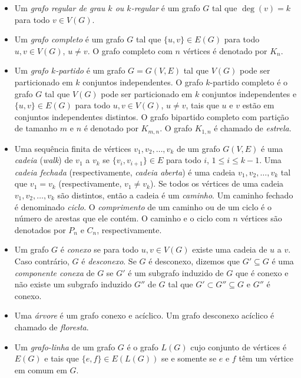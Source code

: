 \documentclass{article}
\begin{document}
\begin{itemize}
    \item Um \emph{grafo regular de grau \(k\) ou \(k\)-regular} é um grafo \(G\) tal que \(\deg(v) = k\) para todo \(v \in V(G)\).
    \item Um \emph{grafo completo} é um grafo \(G\) tal que \(\{u,v\} \in E(G)\) para todo \(u,v \in V(G)\), \(u \neq v\). O grafo completo com \(n\) vértices é denotado por \(K_n\).
    \item Um \emph{grafo \(k\)-partido} é um grafo \(G=G(V,E)\) tal que \(V(G)\) pode ser particionado em \(k\) conjuntos independentes. O grafo \(k\)-partido completo é o grafo \(G\) tal que \(V(G)\) pode ser particionado em \(k\) conjuntos independentes e \(\{u,v\} \in E(G)\) para todo \(u,v \in V(G)\), \(u \neq v\), tais que \(u\) e \(v\) estão em conjuntos independentes distintos. O grafo bipartido completo com partição de tamanho \(m\) e \(n\) é denotado por \(K_{m,n}\). O grafo \(K_{1,n}\) é chamado de \emph{estrela}.
    \item Uma sequência finita de vértices \(v_1, v_2, \ldots, v_k\) de um grafo \(G(V,E)\) é uma \emph{cadeia} (\emph{walk}) de \(v_1\) a \(v_k\) se \(\{v_i, v_{i+1}\} \in E\) para todo \(i\), \(1 \leq i \leq k-1\). Uma \emph{cadeia fechada} (respectivamente, \emph{cadeia aberta}) é uma cadeia \(v_1, v_2, \ldots, v_k\) tal que \(v_1 = v_k\) (respectivamente, \(v_1 \neq v_k\)). Se todos os vértices de uma cadeia \(v_1, v_2, \ldots, v_k\) são distintos, então a cadeia é um \emph{caminho}. Um caminho fechado é denominado \emph{ciclo}. O \emph{comprimento} de um caminho ou de um ciclo é o número de arestas que ele contém. O caminho e o ciclo com \(n\) vértices são denotados por \(P_n\) e \(C_n\), respectivamente.
    \item Um grafo \(G\) é \emph{conexo} se para todo \(u,v \in V(G)\) existe uma cadeia de \(u\) a \(v\). Caso contrário, \(G\) é \emph{desconexo}. Se \(G\) é desconexo, dizemos que \(G' \subseteq G\) é uma \emph{componente conexa} de \(G\) se \(G'\) é um subgrafo induzido de \(G\) que é conexo e não existe um subgrafo induzido \(G''\) de \(G\) tal que \(G' \subset G'' \subseteq G\) e \(G''\) é conexo.
    \item Uma \emph{árvore} é um grafo conexo e acíclico. Um grafo desconexo acíclico é chamado de \emph{floresta}.
    \item Um \emph{grafo-linha} de um grafo \(G\) é o grafo \(L(G)\) cujo conjunto de vértices é \(E(G)\) e tais que \(\{e,f\} \in E(L(G))\) se e somente se \(e\) e \(f\) têm um vértice em comum em \(G\).

\end{itemize}
\end{document}

